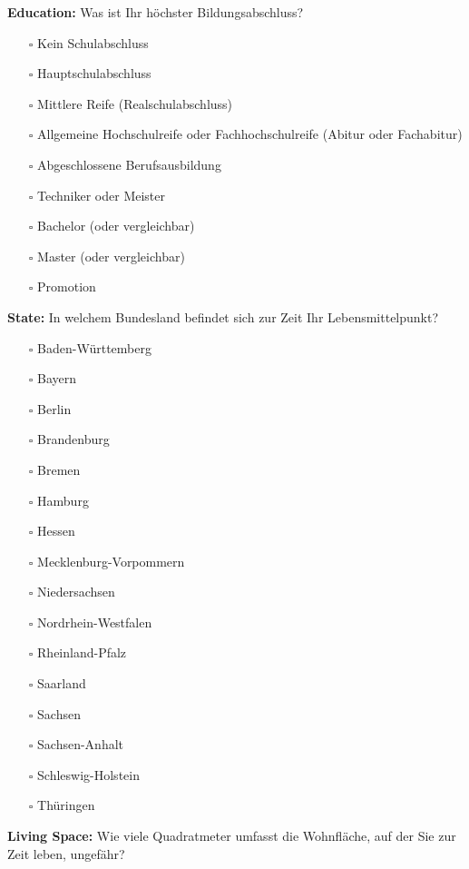 \documentclass[egregdoesnotlikesansseriftitles]{scrartcl}
\begin{document}
\vspace{1em}
\noindent\textbf{Education:} Was ist Ihr höchster Bildungsabschluss?
\begin{itemize}
   \item[$\square$] Kein Schulabschluss
   \item[$\square$] Hauptschulabschluss
   \item[$\square$] Mittlere Reife (Realschulabschluss)
   \item[$\square$] Allgemeine Hochschulreife oder Fachhochschulreife (Abitur oder Fachabitur)
   \item[$\square$] Abgeschlossene Berufsausbildung
   \item[$\square$] Techniker oder Meister
   \item[$\square$] Bachelor (oder vergleichbar)
   \item[$\square$] Master (oder vergleichbar)
   \item[$\square$] Promotion
\end{itemize}

\vspace{1em}
\noindent\textbf{State:} In welchem Bundesland befindet sich zur Zeit Ihr Lebensmittelpunkt?
\begin{itemize}
   \item[$\square$] Baden-Württemberg
   \item[$\square$] Bayern
   \item[$\square$] Berlin
   \item[$\square$] Brandenburg
   \item[$\square$] Bremen
   \item[$\square$] Hamburg
   \item[$\square$] Hessen
   \item[$\square$] Mecklenburg-Vorpommern
   \item[$\square$] Niedersachsen
   \item[$\square$] Nordrhein-Westfalen
   \item[$\square$] Rheinland-Pfalz
   \item[$\square$] Saarland
   \item[$\square$] Sachsen
   \item[$\square$] Sachsen-Anhalt
   \item[$\square$] Schleswig-Holstein
   \item[$\square$] Thüringen
\end{itemize}

\vspace{1em}
\noindent\textbf{Living Space:} Wie viele Quadratmeter umfasst die Wohnfläche, auf der Sie zur Zeit leben, ungefähr?
\end{document}

